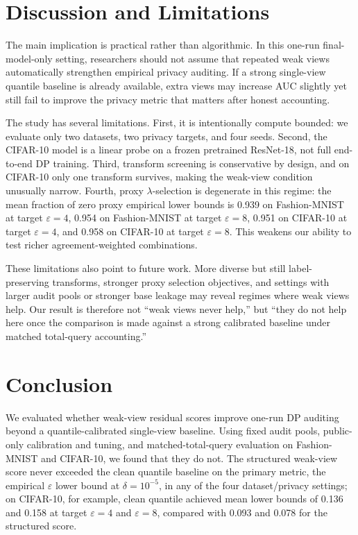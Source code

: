 \documentclass{article}
\newcommand{\eps}{\varepsilon}
\newcommand{\del}{\delta}
\begin{document}
\section{Discussion and Limitations}
\label{sec:discussion}
The main implication is practical rather than algorithmic. In this one-run final-model-only setting, researchers should not assume that repeated weak views automatically strengthen empirical privacy auditing. If a strong single-view quantile baseline is already available, extra views may increase AUC slightly yet still fail to improve the privacy metric that matters after honest accounting.

The study has several limitations. First, it is intentionally compute bounded: we evaluate only two datasets, two privacy targets, and four seeds. Second, the CIFAR-10 model is a linear probe on a frozen pretrained ResNet-18, not full end-to-end DP training. Third, transform screening is conservative by design, and on CIFAR-10 only one transform survives, making the weak-view condition unusually narrow. Fourth, proxy \(\lambda\)-selection is degenerate in this regime: the mean fraction of zero proxy empirical lower bounds is 0.939 on Fashion-MNIST at target \(\eps=4\), 0.954 on Fashion-MNIST at target \(\eps=8\), 0.951 on CIFAR-10 at target \(\eps=4\), and 0.958 on CIFAR-10 at target \(\eps=8\). This weakens our ability to test richer agreement-weighted combinations.

These limitations also point to future work. More diverse but still label-preserving transforms, stronger proxy selection objectives, and settings with larger audit pools or stronger base leakage may reveal regimes where weak views help. Our result is therefore not ``weak views never help,'' but ``they do not help here once the comparison is made against a strong calibrated baseline under matched total-query accounting.''

\section{Conclusion}
\label{sec:conclusion}
We evaluated whether weak-view residual scores improve one-run DP auditing beyond a quantile-calibrated single-view baseline. Using fixed audit pools, public-only calibration and tuning, and matched-total-query evaluation on Fashion-MNIST and CIFAR-10, we found that they do not. The structured weak-view score never exceeded the clean quantile baseline on the primary metric, the empirical \(\eps\) lower bound at \(\del=10^{-5}\), in any of the four dataset/privacy settings; on CIFAR-10, for example, clean quantile achieved mean lower bounds of 0.136 and 0.158 at target \(\eps=4\) and \(\eps=8\), compared with 0.093 and 0.078 for the structured score.
\end{document}
